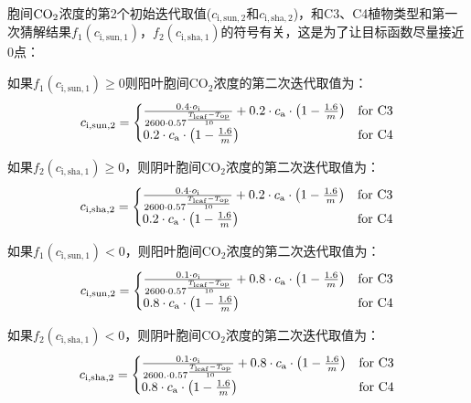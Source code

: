 胞间$\rm CO_2$浓度的第2个初始迭代取值($c_{\mathrm{i,sun,2}}$和$c_{\mathrm{i,sha,2}}$)，和C3、C4植物类型和第一次猜解结果$f_{1}\left(c_{\mathrm{i,sun,1}}\right)$，$f_{2}\left(c_{\mathrm{i,sha,1}}\right)$的符号有关，这是为了让目标函数尽量接近0点：

如果$f_{1}\left(c_{\mathrm{i,sun,1}}\right)\geqslant 0$则阳叶胞间$\mathrm {CO_2}$浓度的第二次迭代取值为：
\begin{align}\label{cisun_2_fp}
c_{\mathrm{i,sun,2}}=
\begin{cases}
\frac{0.4 \cdot o_{\mathrm{i}}} {2600 \cdot 0.57 ^\frac{T_{\mathrm{{leaf }}} -  T_{\mathrm{o p}}}{10}} + 0.2\cdot c_{\mathrm{a}}\cdot\left(1-\frac{1.6}{m}\right)  &\rm for\,\, C3\\
0.2\cdot c_{\mathrm{a}}\cdot\left(1-\frac{1.6}{m}\right) &\rm for\,\, C4
\end{cases}
\end{align}

如果$f_{2}\left(c_{\mathrm{i,sha,1}}\right)\geqslant0$，则阴叶胞间$\mathrm {CO_2}$浓度的第二次迭代取值为：
\begin{align}\label{cisha_2_fp}
c_{\mathrm{i,sha,2}}=
\begin{cases}
\frac{0.4 \cdot o_{\mathrm{i}}} {2600 \cdot 0.57 ^\frac{T_{\mathrm{{leaf }}} -  T_{\mathrm{o p}}}{10}} + 0.2\cdot c_{\mathrm{a}}\cdot\left(1-\frac{1.6}{m}\right)  &\rm for\,\, C3\\
0.2\cdot c_{\mathrm{a}}\cdot\left(1-\frac{1.6}{m}\right) &\rm for\,\, C4
\end{cases}
\end{align}

如果$f_{1}\left(c_{\mathrm{i,sun,1}}\right)<0$，则阳叶胞间$\mathrm {CO_2}$浓度的第二次迭代取值为：
\begin{align}\label{cisun_2_fn}
c_{\mathrm{i,sun,2}}=
\begin{cases}
\frac{0.1 \cdot o_{\mathrm{i}}} {2600 \cdot 0.57 ^\frac{T_{\mathrm{{leaf }}} -  T_{\mathrm{o p}}}{10}} + 0.8\cdot c_{\mathrm{a}}\cdot\left(1-\frac{1.6}{m}\right)  &\rm for\,\, C3\\
0.8\cdot c_{\mathrm{a}}\cdot\left(1-\frac{1.6}{m}\right) &\rm for\,\, C4
\end{cases}
\end{align}

如果$f_{2}\left(c_{\mathrm{i,sha,1}}\right)<0$，则阴叶胞间$\mathrm {CO_2}$浓度的第二次迭代取值为：
\begin{align}\label{cisha_2_fn}
c_{\mathrm{i,sha,2}}=
\begin{cases}
\frac{0.1 \cdot o_{\mathrm{i}}} {2600. \cdot 0.57 ^\frac{T_{\mathrm{{leaf }}} -  T_{\mathrm{o p}}}{10}} + 0.8\cdot c_{\mathrm{a}}\cdot\left(1-\frac{1.6}{m}\right)  &\rm for\,\, C3\\
0.8\cdot c_{\mathrm{a}}\cdot\left(1-\frac{1.6}{m}\right) &\rm for\,\, C4
\end{cases}
\end{align}

